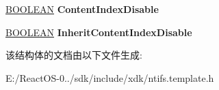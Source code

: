 \begin{DoxyCompactItemize}
\item 
\mbox{\label{struct___f_i_l_e___o_l_e___i_n_f_o_r_m_a_t_i_o_n_acf2147b60a364afa7990ab01c1ef469a}} 
\hyperlink{_processor_bind_8h_a112e3146cb38b6ee95e64d85842e380a}{B\+O\+O\+L\+E\+AN} {\bfseries Content\+Index\+Disable}
\item 
\mbox{\label{struct___f_i_l_e___o_l_e___i_n_f_o_r_m_a_t_i_o_n_a9cd85d7dd86d691a88765b5b7e6fc8b7}} 
\hyperlink{_processor_bind_8h_a112e3146cb38b6ee95e64d85842e380a}{B\+O\+O\+L\+E\+AN} {\bfseries Inherit\+Content\+Index\+Disable}
\end{DoxyCompactItemize}


该结构体的文档由以下文件生成\+:\begin{DoxyCompactItemize}
\item 
E\+:/\+React\+O\+S-\/0../sdk/include/xdk/ntifs.\+template.\+h\end{DoxyCompactItemize}

